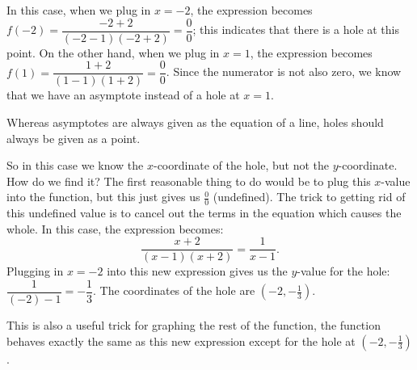 \documentclass[../book.tex]{subfiles}
\begin{document}
In this case, when we plug in $x=-2$, the expression becomes $f(-2)=\dfrac{-2+2}{(-2-1)(-2+2)}=\dfrac{0}{0}$; this indicates that there is a hole at this point.  On the other hand, when we plug in $x=1$, the expression becomes $f(1)=\dfrac{1+2}{(1-1)(1+2)}=\dfrac{0}{0}$. Since the numerator is not also zero, we know that we have an asymptote instead of a hole at $x=1$.
\begin{note}
Whereas asymptotes are always given as the equation of a line, holes should always be given as a point.
\end{note}
So in this case we know the $x$-coordinate of the hole, but not the $y$-coordinate. How do we find it? The first reasonable thing to do would be to plug this $x$-value into the function, but this just gives us $\frac{0}{0}$ (undefined). The trick to getting rid of this undefined value is to cancel out the terms in the equation which causes the whole. In this case, the expression becomes: $$\dfrac{x+2}{(x-1)(x+2)}=\dfrac{1}{x-1}.$$
Plugging in $x=-2$ into this new expression gives us the $y$-value for the hole: $\dfrac{1}{(-2)-1}=-\dfrac{1}{3}$. The coordinates of the hole are $(-2,-\frac{1}{3})$.

This is also a useful trick for graphing the rest of the function, the function behaves exactly the same as this new expression except for the hole at $(-2,-\frac{1}{3})$.
\end{document}
